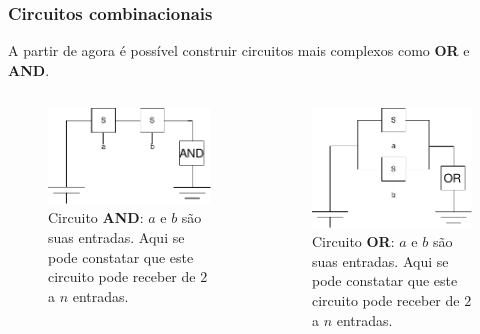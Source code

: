 \begin{frame}
	\frametitle{Circuitos combinacionais}
	\par A partir de agora é possível construir circuitos mais complexos como \textbf{OR} e \textbf{AND}.
	\begin{columns}
		\begin{figure}
			\centering
			\includegraphics[width=0.7\linewidth]{images/portaE}
			\caption{Circuito \textbf{AND}: $a$ e $b$ são suas entradas. Aqui se pode constatar que este circuito pode receber de $2$ a $n$ entradas.}
			\label{fig:portae}
		\end{figure}
		\begin{figure}
			\centering
			\includegraphics[width=0.7\linewidth]{images/portaOU}
			\caption{Circuito \textbf{OR}: $a$ e $b$ são suas entradas. Aqui se pode constatar que este circuito pode receber de $2$ a $n$ entradas.}
			\label{fig:portaou}
		\end{figure}
	\end{columns}
\end{frame}

